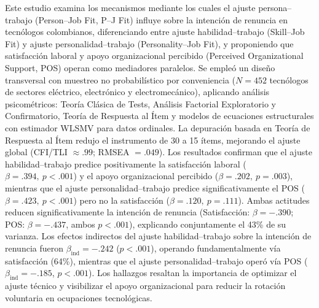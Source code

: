 \begin{mainabstract}
Este estudio examina los mecanismos mediante los cuales el ajuste persona--trabajo (Person--Job Fit, P--J Fit) influye sobre la intención de renuncia en tecnólogos colombianos, diferenciando entre ajuste habilidad--trabajo (Skill--Job Fit) y ajuste personalidad--trabajo (Personality--Job Fit), y proponiendo que satisfacción laboral y apoyo organizacional percibido (Perceived Organizational Support, POS) operan como mediadores paralelos. Se empleó un diseño transversal con muestreo no probabilístico por conveniencia (\(N=452\) tecnólogos de sectores eléctrico, electrónico y electromecánico), aplicando análisis psicométricos: Teoría Clásica de Tests, Análisis Factorial Exploratorio y Confirmatorio, Teoría de Respuesta al Ítem y modelos de ecuaciones estructurales con estimador WLSMV para datos ordinales. La depuración basada en Teoría de Respuesta al Ítem redujo el instrumento de 30 a 15 ítems, mejorando el ajuste global (CFI/TLI \(\approx .99\); RMSEA \(= .049\)). Los resultados confirman que el ajuste habilidad--trabajo predice positivamente la satisfacción laboral (\(\beta=.394,\ p<.001\)) y el apoyo organizacional percibido (\(\beta=.202,\ p=.003\)), mientras que el ajuste personalidad--trabajo predice significativamente el POS (\(\beta=.423,\ p<.001\)) pero no la satisfacción (\(\beta=.120,\ p=.111\)). Ambas actitudes reducen significativamente la intención de renuncia (Satisfacción: \(\beta=-.390\); POS: \(\beta=-.437\), ambos \(p<.001\)), explicando conjuntamente el 43\% de su varianza. Los efectos indirectos del ajuste habilidad--trabajo sobre la intención de renuncia fueron \(\beta_{\text{ind}}=-.242\) (\(p<.001\)), operando fundamentalmente vía satisfacción (64\%), mientras que el ajuste personalidad--trabajo operó vía POS (\(\beta_{\text{ind}}=-.185\), \(p<.001\)). Los hallazgos resaltan la importancia de optimizar el ajuste técnico y visibilizar el apoyo organizacional para reducir la rotación voluntaria en ocupaciones tecnológicas.
\end{mainabstract}

